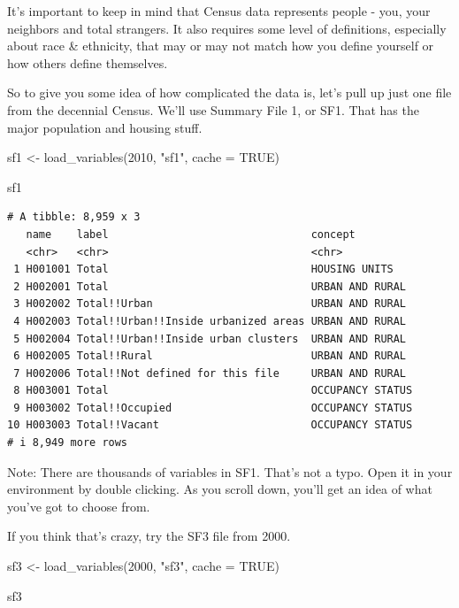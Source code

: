\documentclass[
  letterpaper,
  DIV=11,
  numbers=noendperiod]{scrreprt}
\newenvironment{Shaded}{\begin{snugshade}}{\end{snugshade}}
\newcommand{\AttributeTok}[1]{\textcolor[rgb]{0.40,0.45,0.13}{#1}}
\newcommand{\ConstantTok}[1]{\textcolor[rgb]{0.56,0.35,0.01}{#1}}
\newcommand{\DecValTok}[1]{\textcolor[rgb]{0.68,0.00,0.00}{#1}}
\newcommand{\FunctionTok}[1]{\textcolor[rgb]{0.28,0.35,0.67}{#1}}
\newcommand{\NormalTok}[1]{\textcolor[rgb]{0.00,0.23,0.31}{#1}}
\newcommand{\OtherTok}[1]{\textcolor[rgb]{0.00,0.23,0.31}{#1}}
\newcommand{\StringTok}[1]{\textcolor[rgb]{0.13,0.47,0.30}{#1}}
\begin{document}
It's important to keep in mind that Census data represents people - you,
your neighbors and total strangers. It also requires some level of
definitions, especially about race \& ethnicity, that may or may not
match how you define yourself or how others define themselves.

So to give you some idea of how complicated the data is, let's pull up
just one file from the decennial Census. We'll use Summary File 1, or
SF1. That has the major population and housing stuff.

\begin{Shaded}
\begin{Highlighting}[]
\NormalTok{sf1 }\OtherTok{\textless{}{-}} \FunctionTok{load\_variables}\NormalTok{(}\DecValTok{2010}\NormalTok{, }\StringTok{"sf1"}\NormalTok{, }\AttributeTok{cache =} \ConstantTok{TRUE}\NormalTok{)}

\NormalTok{sf1}
\end{Highlighting}
\end{Shaded}

\begin{verbatim}
# A tibble: 8,959 x 3
   name    label                                concept         
   <chr>   <chr>                                <chr>           
 1 H001001 Total                                HOUSING UNITS   
 2 H002001 Total                                URBAN AND RURAL 
 3 H002002 Total!!Urban                         URBAN AND RURAL 
 4 H002003 Total!!Urban!!Inside urbanized areas URBAN AND RURAL 
 5 H002004 Total!!Urban!!Inside urban clusters  URBAN AND RURAL 
 6 H002005 Total!!Rural                         URBAN AND RURAL 
 7 H002006 Total!!Not defined for this file     URBAN AND RURAL 
 8 H003001 Total                                OCCUPANCY STATUS
 9 H003002 Total!!Occupied                      OCCUPANCY STATUS
10 H003003 Total!!Vacant                        OCCUPANCY STATUS
# i 8,949 more rows
\end{verbatim}

Note: There are thousands of variables in SF1. That's not a typo. Open
it in your environment by double clicking. As you scroll down, you'll
get an idea of what you've got to choose from.

If you think that's crazy, try the SF3 file from 2000.

\begin{Shaded}
\begin{Highlighting}[]
\NormalTok{sf3 }\OtherTok{\textless{}{-}} \FunctionTok{load\_variables}\NormalTok{(}\DecValTok{2000}\NormalTok{, }\StringTok{"sf3"}\NormalTok{, }\AttributeTok{cache =} \ConstantTok{TRUE}\NormalTok{)}

\NormalTok{sf3}
\end{Highlighting}
\end{Shaded}
\end{document}
